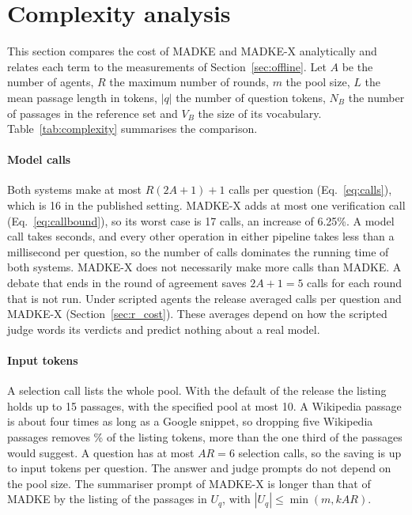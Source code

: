 \section{Complexity analysis}
\label{sec:complexity}

This section compares the cost of MADKE and MADKE-X analytically and relates each term to the measurements of Section~\ref{sec:offline}. Let $A$ be the number of agents, $R$ the maximum number of rounds, $m$ the pool size, $L$ the mean passage length in tokens, $|q|$ the number of question tokens, $N_B$ the number of passages in the reference set and $V_B$ the size of its vocabulary. Table~\ref{tab:complexity} summarises the comparison.

\paragraph{Model calls} Both systems make at most $R(2A+1)+1$ calls per question (Eq.~\eqref{eq:calls}), which is 16 in the published setting. MADKE-X adds at most one verification call (Eq.~\eqref{eq:callbound}), so its worst case is 17 calls, an increase of 6.25\%. A model call takes seconds, and every other operation in either pipeline takes less than a millisecond per question, so the number of calls dominates the running time of both systems. MADKE-X does not necessarily make more calls than MADKE. A debate that ends in the round of agreement saves $2A+1=5$ calls for each round that is not run. Under scripted agents the release averaged \VCallsRel{} calls per question and MADKE-X \VCallsX{} (Section~\ref{sec:r_cost}). These averages depend on how the scripted judge words its verdicts and predict nothing about a real model.

\paragraph{Input tokens} A selection call lists the whole pool. With the default of the release the listing holds up to 15 passages, with the specified pool at most 10. A Wikipedia passage is about four times as long as a Google snippet, so dropping five Wikipedia passages removes \VTokRedMean\% of the listing tokens, more than the one third of the passages would suggest. A question has at most $AR=6$ selection calls, so the saving is up to \VTokSavedSixMax{} input tokens per question. The answer and judge prompts do not depend on the pool size. The summariser prompt of MADKE-X is longer than that of MADKE by the listing of the passages in $U_q$, with $|U_q|\le \min(m, kAR)$.

